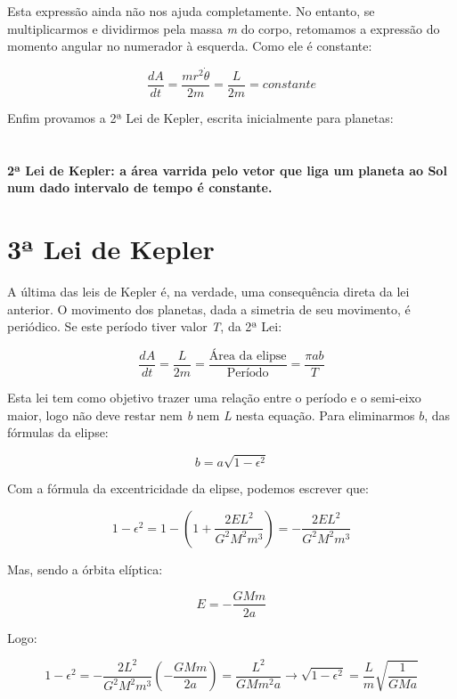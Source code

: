 Esta expressão ainda não nos ajuda completamente. No entanto, se multiplicarmos e dividirmos pela massa \textit{m} do corpo, retomamos a expressão do momento angular no numerador à esquerda. Como ele é constante:

\begin{equation}
	\frac{dA}{dt} = \frac{mr^2\dot{\theta}}{2m} = \frac{L}{2m} = constante \label{eq58}
\end{equation}

Enfim provamos a 2ª Lei de Kepler, escrita inicialmente para planetas:{\\}{\\}{\\}
\textbf{\Large{2ª Lei de Kepler: a área varrida pelo vetor que liga um planeta ao Sol num dado intervalo de tempo é constante.}} {\\}

\section{3ª Lei de Kepler}

A última das leis de Kepler é, na verdade, uma consequência direta da lei anterior. O movimento dos planetas, dada a simetria de seu movimento, é periódico. Se este período tiver valor \textit{T}, da 2ª Lei:

\begin{equation}
	\frac{dA}{dt} = \frac{L}{2m} = \frac{\text{Área da elipse}}{\text{Período}} = \frac{\pi ab}{T} \label{eq59}
\end{equation}

Esta lei tem como objetivo trazer uma relação entre o período e o semi-eixo maior, logo não deve restar nem \textit{b} nem \textit{L} nesta equação. Para eliminarmos $b$, das fórmulas da elipse:

\[
	b = a\sqrt{1 - \epsilon^2}
\]

Com a fórmula da excentricidade da elipse, podemos escrever que:

\[
	1 - \epsilon^2 = 1 - \left(1 + \frac{2EL^2}{G^2M^2m^3}\right) = - \frac{2EL^2}{G^2M^2m^3}
\]

Mas, sendo a órbita elíptica:

\[
	E = -\frac{GMm}{2a}
\]

Logo:

\[
	1 - \epsilon^2 = -\frac{2L^2}{G^2M^2m^3}\left(-\frac{GMm}{2a}\right) = \frac{L^2}{GMm^2a} \rightarrow \sqrt{1-\epsilon^2} = \frac{L}{m}\sqrt{\frac{1}{GMa}}
\]{\\}

